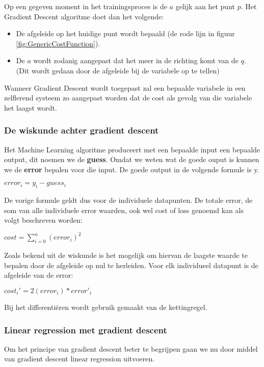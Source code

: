 Op een gegeven moment in het trainingsproces is de $a$ gelijk aan het punt $p$. Het Gradient Descent algoritme doet dan het volgende:
\begin{itemize}
\item De afgeleide op het huidige punt wordt bepaald (de rode lijn in figuur \ref{fig:GenericCostFunction}).
\item De $a$ wordt zodanig aangepast dat het meer in de richting komt van de $q$. (Dit wordt gedaan door de afgeleide bij de variabele op te tellen)
\end{itemize}

Wanneer Gradient Descent wordt toegepast zal een bepaalde variabele in een zelflerend systeem zo aangepast worden dat de cost als gevolg van die variabele het laagst wordt. 

\subsubsection{De wiskunde achter gradient descent}
Het Machine Learning algoritme produceert met een bepaalde input een bepaalde output, dit noemen we de \textbf{guess}. Omdat we weten wat de goede ouput is kunnen we de \textbf{error} bepalen voor die input. De goede output in de volgende formule is y.

\begin{center}
$ error_{i} = y_{i} - guess_{i}$
\end{center} 

De vorige formule geldt dus voor de individuele datapunten. De totale error, de som van alle individuele error waarden, ook wel cost of loss genoemd kan als volgt beschreven worden:

\begin{center}
$ cost = \sum_{i=0}^n(error_i)^2$
\end{center}

Zoals bekend uit de wiskunde is het mogelijk om hiervan de laagste waarde te bepalen door de afgeleide op nul te herleiden. Voor elk individueel datapunt is de afgeleide van de error:

\begin{center}
$ cost_i' = 2(error_i) * error'_i$
\end{center}

Bij het differenti\"{e}ren wordt gebruik gemaakt van de kettingregel.

\subsubsection{Linear regression met gradient descent}
Om het principe van gradient descent beter te begrijpen gaan we nu door middel van gradient descent linear regression uitvoeren.

